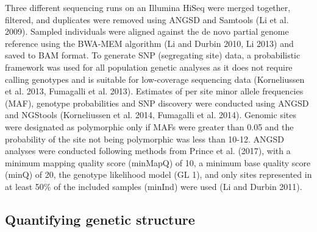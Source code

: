 \documentclass[twoside,12pt,final]{ucthesis-CA2012} %
\begin{document}
\begin{ucmainmatter}
Three different sequencing runs on an Illumina HiSeq were merged
together, filtered, and duplicates were removed using ANGSD and Samtools
(Li et al. 2009). Sampled individuals were aligned against the de novo
partial genome reference using the BWA-MEM algorithm (Li and Durbin
2010, Li 2013) and saved to BAM format. To generate SNP (segregating
site) data, a probabilistic framework was used for all population
genetic analyses as it does not require calling genotypes and is
suitable for low-coverage sequencing data (Korneliussen et al. 2013,
Fumagalli et al. 2013). Estimates of per site minor allele frequencies
(MAF), genotype probabilities and SNP discovery were conducted using
ANGSD and NGStools (Korneliussen et al. 2014, Fumagalli et al. 2014).
Genomic sites were designated as polymorphic only if MAFs were greater
than 0.05 and the probability of the site not being polymorphic was less
than 10-12. ANGSD analyses were conducted following methods from Prince
et al. (2017), with a minimum mapping quality score (minMapQ) of 10, a
minimum base quality score (minQ) of 20, the genotype likelihood model
(GL 1), and only sites represented in at least 50\% of the included
samples (minInd) were used (Li and Durbin 2011).

\hypertarget{quantifying-genetic-structure}{%
\subsection{Quantifying genetic
structure}\label{quantifying-genetic-structure}}


\end{ucmainmatter}
\end{document}
